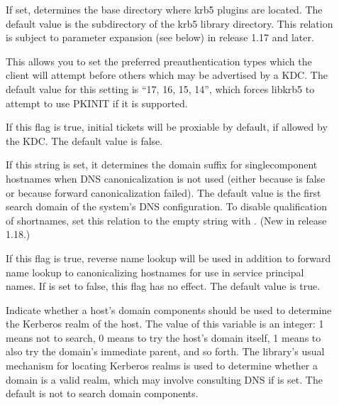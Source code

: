 \documentclass[letterpaper,10pt,english]{sphinxmanual}
\begin{document}
\begin{description}
\item[{}] \leavevmode
\sphinxAtStartPar
If set, determines the base directory where krb5 plugins are
located.  The default value is the  subdirectory
of the krb5 library directory.  This relation is subject to
parameter expansion (see below) in release 1.17 and later.

\item[{}] \leavevmode
\sphinxAtStartPar
This allows you to set the preferred preauthentication types which
the client will attempt before others which may be advertised by a
KDC.  The default value for this setting is “17, 16, 15, 14”,
which forces libkrb5 to attempt to use PKINIT if it is supported.

\item[{}] \leavevmode
\sphinxAtStartPar
If this flag is true, initial tickets will be proxiable by
default, if allowed by the KDC.  The default value is false.

\item[{}] \leavevmode
\sphinxAtStartPar
If this string is set, it determines the domain suffix for
single\sphinxhyphen{}component hostnames when DNS canonicalization is not used
(either because  is false or because
forward canonicalization failed).  The default value is the first
search domain of the system’s DNS configuration.  To disable
qualification of shortnames, set this relation to the empty string
with .  (New in release 1.18.)

\item[{}] \leavevmode
\sphinxAtStartPar
If this flag is true, reverse name lookup will be used in addition
to forward name lookup to canonicalizing hostnames for use in
service principal names.  If  is set
to false, this flag has no effect.  The default value is true.

\item[{}] \leavevmode
\sphinxAtStartPar
Indicate whether a host’s domain components should be used to
determine the Kerberos realm of the host.  The value of this
variable is an integer: \sphinxhyphen{}1 means not to search, 0 means to try the
host’s domain itself, 1 means to also try the domain’s immediate
parent, and so forth.  The library’s usual mechanism for locating
Kerberos realms is used to determine whether a domain is a valid
realm, which may involve consulting DNS if  is
set.  The default is not to search domain components.


\end{description}
\end{document}
